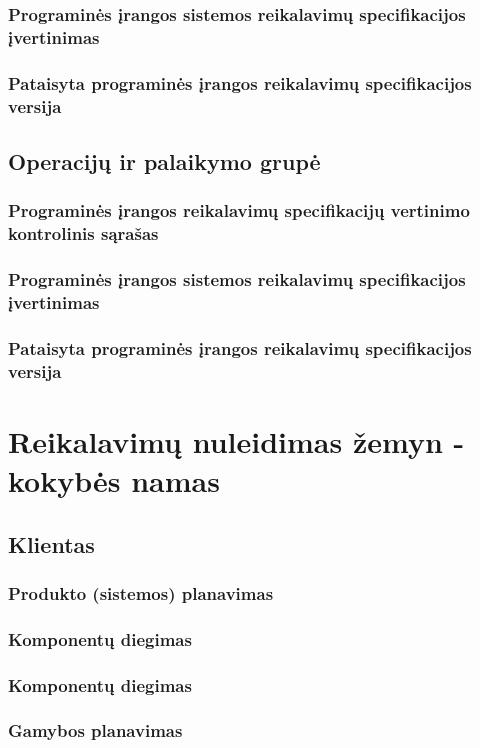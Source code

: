 \documentclass{VUMIFPSkursinis}
\begin{document}
\subsubsection{Programinės įrangos sistemos reikalavimų specifikacijos įvertinimas}
\subsubsection{Pataisyta programinės įrangos reikalavimų specifikacijos versija}
\subsection{Operacijų ir palaikymo grupė}
\subsubsection{Programinės įrangos reikalavimų specifikacijų vertinimo kontrolinis sąrašas}
\subsubsection{Programinės įrangos sistemos reikalavimų specifikacijos įvertinimas}
\subsubsection{Pataisyta programinės įrangos reikalavimų specifikacijos versija}

\section{Reikalavimų nuleidimas žemyn - kokybės namas}
\subsection{Klientas}
\subsubsection{Produkto (sistemos) planavimas}
\subsubsection{Komponentų diegimas}
\subsubsection{Komponentų diegimas}
\subsubsection{Gamybos planavimas}
\end{document}
